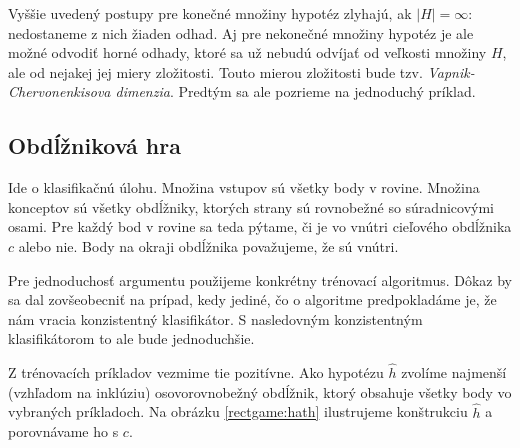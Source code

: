 Vyššie uvedený postupy pre konečné množiny hypotéz zlyhajú, ak
$|H| = \infty$: nedostaneme z nich žiaden odhad. Aj pre nekonečné
množiny hypotéz je ale možné odvodiť horné odhady, ktoré sa už nebudú
odvíjať od veľkosti množiny $H$, ale od nejakej jej miery zložitosti.
Touto mierou zložitosti bude tzv. \emph{Vapnik-Chervonenkisova dimenzia}.
Predtým sa ale pozrieme na jednoduchý príklad.




\subsection{Obdĺžniková hra}

Ide o klasifikačnú úlohu. Množina vstupov sú všetky body v rovine.
Množina konceptov sú všetky obdĺžniky, ktorých strany sú rovnobežné
so súradnicovými osami. Pre každý bod v rovine sa teda pýtame, či je
vo vnútri cieľového obdĺžnika $c$ alebo nie. Body na okraji obdĺžnika
považujeme, že sú vnútri.

Pre jednoduchosť argumentu použijeme konkrétny trénovací algoritmus.
Dôkaz by sa dal zovšeobecniť na prípad, kedy jediné, čo o algoritme
predpokladáme je, že nám vracia konzistentný klasifikátor. S nasledovným
konzistentným klasifikátorom to ale bude jednoduchšie.

\medskip

Z trénovacích príkladov vezmime tie pozitívne. Ako hypotézu $\hat{h}$
zvolíme najmenší (vzhľadom na inklúziu) osovorovnobežný obdĺžnik,
ktorý obsahuje všetky body vo vybraných príkladoch. Na obrázku
\ref{rectgame:hath} ilustrujeme konštrukciu $\hat{h}$ a porovnávame
ho s $c$.


